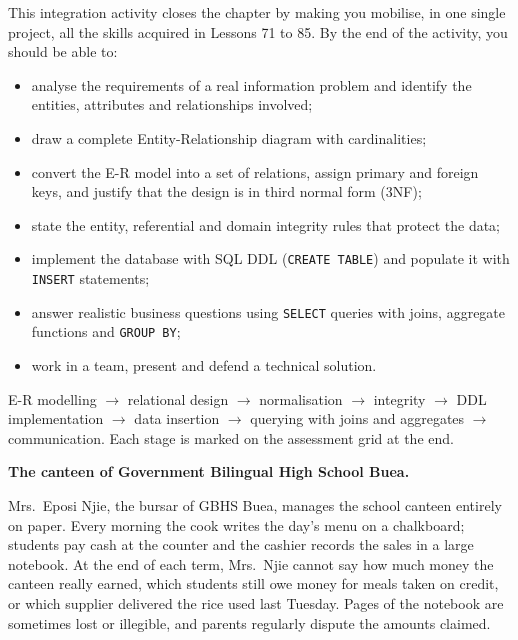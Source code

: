 \documentclass[11pt]{article}
\newcommand{\cle}[1]{{\popxbold\color{popdark}#1}}
\newcounter{popsec}
\newcounter{popsub}
\newcommand{\courssub}[1]{%
  \stepcounter{popsub}%
  \par\vspace{9pt}\noindent{\popxbold\fontsize{11.5}{13}\selectfont\color{popink}{\color{poporange}\thepopsec.\thepopsub}\hspace{6pt}#1}\par\nopagebreak\vspace{4pt}
}
\begin{document}
This integration activity closes the chapter by making you mobilise, in one single project, all the skills acquired in Lessons 71 to 85. By the end of the activity, you should be able to:

\begin{itemize}
\item analyse the requirements of a real information problem and identify the entities, attributes and relationships involved;
\item draw a complete \cle{Entity-Relationship diagram} with cardinalities;
\item convert the E-R model into a set of \cle{relations}, assign primary and foreign keys, and justify that the design is in \cle{third normal form (3NF)};
\item state the \cle{entity, referential and domain integrity} rules that protect the data;
\item implement the database with \cle{SQL DDL} (\texttt{CREATE TABLE}) and populate it with \texttt{INSERT} statements;
\item answer realistic business questions using \texttt{SELECT} queries with \cle{joins}, \cle{aggregate functions} and \texttt{GROUP BY};
\item work in a team, present and defend a technical solution.
\end{itemize}

\begin{aretenir}
E-R modelling $\rightarrow$ relational design $\rightarrow$ normalisation $\rightarrow$ integrity $\rightarrow$ DDL implementation $\rightarrow$ data insertion $\rightarrow$ querying with joins and aggregates $\rightarrow$ communication. Each stage is marked on the assessment grid at the end.
\end{aretenir}

\courssub{Situation}

\textbf{The canteen of Government Bilingual High School Buea.}\par

Mrs.\ Eposi Njie, the bursar of GBHS Buea, manages the school canteen entirely on paper. Every morning the cook writes the day's menu on a chalkboard; students pay cash at the counter and the cashier records the sales in a large notebook. At the end of each term, Mrs.\ Njie cannot say how much money the canteen really earned, which students still owe money for meals taken on credit, or which supplier delivered the rice used last Tuesday. Pages of the notebook are sometimes lost or illegible, and parents regularly dispute the amounts claimed.
\end{document}
